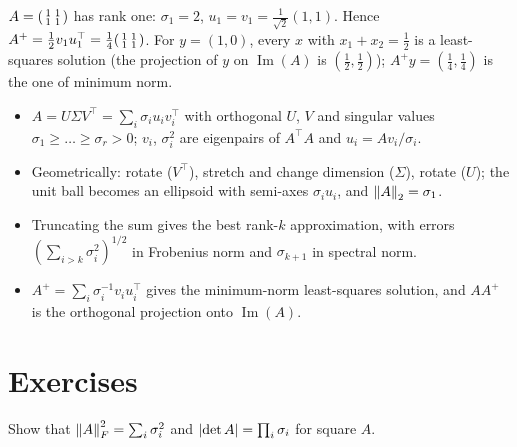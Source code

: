 \begin{notechapter}
\begin{example}
$A = \begin{psmallmatrix}1&1\\1&1\end{psmallmatrix}$ has rank one: $\sigma_1 = 2$, $u_1 = v_1 = \frac1{\sqrt2}(1,1)$.
Hence $A^+ = \frac12v_1u_1^\top = \frac14\begin{psmallmatrix}1&1\\1&1\end{psmallmatrix}$. For $y = (1,0)$,
every $x$ with $x_1 + x_2 = \frac12$ is a least-squares solution (the projection of $y$ on
$\operatorname{Im}(A)$ is $(\frac12,\frac12)$); $A^+y = (\frac14,\frac14)$ is the one of minimum norm.
\end{example}

\begin{chaptersummary}
\begin{itemize}[nosep]
  \item $A = U\Sigma V^\top = \sum_i\sigma_iu_iv_i^\top$ with orthogonal $U$, $V$ and singular values
        $\sigma_1\geq\dots\geq\sigma_r>0$; $v_i$, $\sigma_i^2$ are eigenpairs of $A^\top A$ and
        $u_i = Av_i/\sigma_i$.
  \item Geometrically: rotate ($V^\top$), stretch and change dimension ($\Sigma$), rotate ($U$);
        the unit ball becomes an ellipsoid with semi-axes $\sigma_iu_i$, and $\left\|A\right\|_2 = \sigma_1$.
  \item Truncating the sum gives the best rank-$k$ approximation, with errors
        $(\sum_{i>k}\sigma_i^2)^{1/2}$ in Frobenius norm and $\sigma_{k+1}$ in spectral norm.
  \item $A^+ = \sum_i\sigma_i^{-1}v_iu_i^\top$ gives the minimum-norm least-squares solution, and
        $AA^+$ is the orthogonal projection onto $\operatorname{Im}(A)$.
\end{itemize}
\end{chaptersummary}

\section*{Exercises}

\begin{exercise}\label{svd:exr:1}
Show that $\left\|A\right\|_F^2 = \sum_i\sigma_i^2$ and $\left|\det A\right| = \prod_i\sigma_i$ for square $A$.
\end{exercise}


\end{notechapter}
